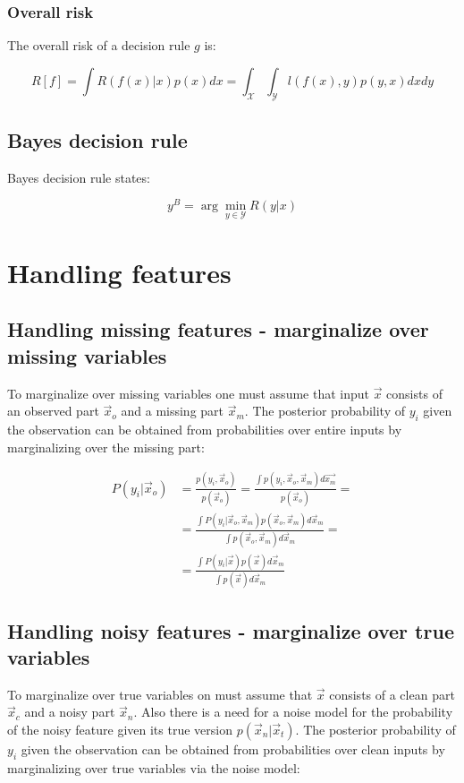 		\subsubsection{Overall risk}
		The overall risk of a decision rule $g$ is:

		$$R[f] = \int R(f(x)|x)p(x)dx = \int_\mathcal{X}\int_\mathcal{Y}l(f(x), y)p(y, x)dxdy$$

	\subsection{Bayes decision rule}
	Bayes decision rule states:

	$$y^B = \arg\min\limits_{y\in\mathcal{Y}} R(y|x)$$

\section{Handling features}

	\subsection{Handling missing features - marginalize over missing variables}
	To marginalize over missing variables one must assume that input $\vec{x}$ consists of an observed part $\vec{x}_o$ and a missing part $\vec{x}_m$.
	The posterior probability of $y_i$ given the observation can be obtained from probabilities over entire inputs by marginalizing over the missing part:

	\begin{align*}
		P(y_i|\vec{x}_o) &= \frac{p(y_i, \vec{x}_o)}{p(\vec{x}_o)} = \frac{\int p(y_i, \vec{x}_o, \vec{x}_m)d\vec{x_m}}{p(\vec{x}_o)}=\\
										 &= \frac{\int P(y_i|\vec{x}_o, \vec{x}_m)p(\vec{x}_o, \vec{x}_m)d\vec{x}_m}{\int p(\vec{x}_o, \vec{x}_m)d\vec{x}_m}=\\
										 &= \frac{\int P(y_i|\vec{x})p(\vec{x})d\vec{x}_m}{\int p(\vec{x})d\vec{x}_m}
	\end{align*}

	\subsection{Handling noisy features - marginalize over true variables}
	To marginalize over true variables on must assume that $\vec{x}$ consists of a clean part $\vec{x}_c$ and a noisy part $\vec{x}_n$.
	Also there is a need for a noise model for the probability of the noisy feature given its true version $p(\vec{x}_n|\vec{x}_t)$.
	The posterior probability of $y_i$ given the observation can be obtained from probabilities over clean inputs by marginalizing over true variables via the noise model:

